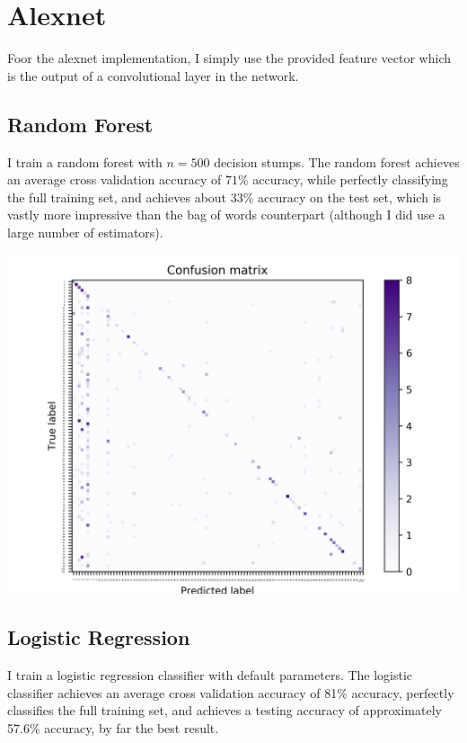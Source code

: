 \documentclass[]{article}
\begin{document}
\section{Alexnet}
Foor the alexnet implementation, I simply use the provided feature vector which is the output of a convolutional layer in the network.

\subsection{Random Forest}
I train a random forest with $n = 500$ decision stumps. The random forest achieves an average cross validation accuracy of $71$\% accuracy, while perfectly classifying the full training set, and achieves about $33$\% accuracy on the test set, which is vastly more impressive than the bag of words counterpart (although I did use a large number of estimators). 

\includegraphics[scale=0.10]{alex_net_random_forest_confusion_results.jpg}


\subsection{Logistic Regression}
I train a logistic regression classifier with default parameters. The logistic classifier achieves an average cross validation accuracy of 81\% accuracy, perfectly classifies the full training set, and achieves a testing accuracy of approximately 57.6\% accuracy, by far the best result.
\end{document}
